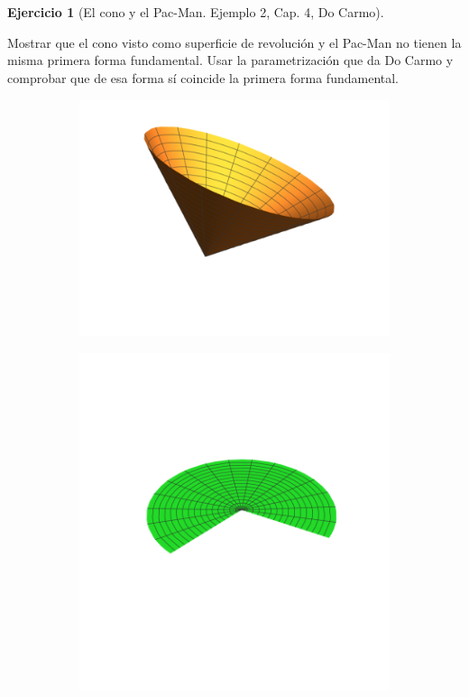 \documentclass[spanish]{book}
\theoremstyle{definition}
\newtheorem*{ejer}{Ejercicio}
\begin{document}
\begin{ejer}[El cono y el Pac-Man. Ejemplo 2, Cap. 4, Do Carmo]\label{cono-pac-man}
	
	Mostrar que el cono visto como superficie de revolución y el Pac-Man no tienen la misma primera forma fundamental. Usar la parametrización que da Do Carmo y comprobar que de esa forma sí coincide la primera forma fundamental.
		\vspace{-2cm}
		\begin{figure}[H]
		\begin{subfigure}{0.5\textwidth}
			\centering
			\includegraphics[width=\linewidth]{sup15}
		\end{subfigure}	\hspace{-1cm}
		\begin{subfigure}{.5\textwidth}
			\centering
			\includegraphics[width=\linewidth]{sup16}

\end{subfigure}
\end{figure}
\end{ejer}
\end{document}
